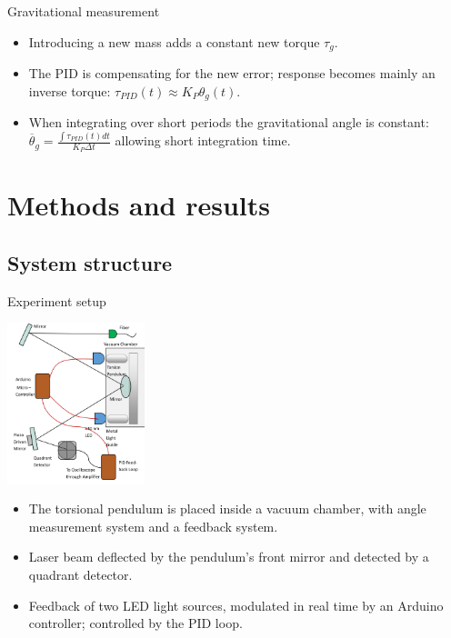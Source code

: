 \documentclass{beamer}
\begin{document}
\begin{frame}{\hypertarget{frame:Gravimetric measurement}{Gravitational measurement}}
	\begin{itemize}
		
		
		\pause
		\item Introducing a new mass adds a constant new torque $\tau_g$. 
		\item The PID is compensating for the new error; response becomes mainly an inverse torque: $\tau_{PID}(t) \approx K_P\theta_g(t)$. 
		\item When integrating over short periods the gravitational angle is constant: $\overline{\theta}_g =  \frac{\int \tau_{PID}(t) dt}{ K_P \Delta t} $ allowing short integration time.
		
		
	\end{itemize}
\end{frame}

\section{Methods and results}
\subsection{System structure}
\begin{frame}{Experiment setup}
	\begin{center}		
			\includegraphics[width=0.3\textwidth,keepaspectratio]{setup cropped.png}
	\end{center}
	\begin{itemize}

		\item The torsional pendulum is placed inside a vacuum chamber, with angle measurement system and a feedback system. 
		\item Laser beam deflected by the pendulum's front mirror and detected by a quadrant detector.
		\pause
		\item Feedback of two LED light sources, modulated in real time by an Arduino controller; controlled by the PID loop.
	
	\end{itemize}
	
\end{frame}
\end{document}
